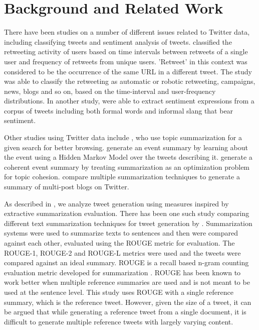 \section{Background and Related Work}
\label{sec:background}

There have been studies on a number of different issues related to Twitter data, including classifying tweets and sentiment analysis of tweets.  classified the retweeting activity of users based on time intervals between retweets of a single user and frequency of retweets from unique users. 'Retweet' in this context was considered to be the occurrence of the same URL in a different tweet. The study was able to classify the retweeting as automatic or robotic retweeting, campaigns, news, blogs and so on, based on the time-interval and user-frequency distributions. In another study,  were able to extract sentiment expressions from a corpus of tweets including both formal words and informal slang that bear sentiment.

Other studies using Twitter data include , who use topic summarization for a given search for better browsing.  generate an event summary by learning about the event using a Hidden Markov Model over the tweets describing it.  generate a coherent event summary by treating summarization as an optimization problem for topic cohesion.  compare multiple summarization techniques to generate a summary of multi-post blogs on Twitter.

As described in , we analyze tweet generation using measures inspired by extractive summarization evaluation. There has been one such study comparing different text summarization techniques for tweet generation by  . Summarization systems were used to summarize texts to sentences and then were compared against each other, evaluated using the ROUGE metric for evaluation. The ROUGE-1, ROUGE-2 and ROUGE-L metrics were used and the tweets were compared against an ideal summary. ROUGE \cite{lin2004rouge} is a recall based n-gram counting evaluation metric developed for summarization \cite{nenkova2006summarization}. ROUGE has been known to work better when multiple reference summaries are used and is not meant to be used at the sentence level. This study uses ROUGE with a single reference summary, which is the reference tweet. However, given the size of a tweet, it can be argued that while generating a reference tweet from a single document, it is difficult to generate multiple reference tweets with largely varying content. 

